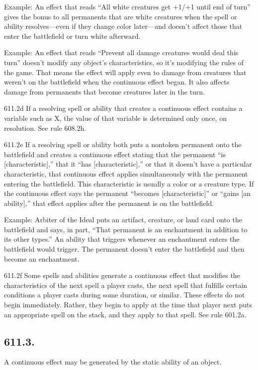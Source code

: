 Example: An effect that reads “All white creatures get +1/+1 until end of turn” gives the bonus to all permanents that are white creatures when the spell or ability resolves—even if they change color later—and doesn’t affect those that enter the battlefield or turn white afterward.

Example: An effect that reads “Prevent all damage creatures would deal this turn” doesn’t modify any object’s characteristics, so it’s modifying the rules of the game. That means the effect will apply even to damage from creatures that weren’t on the battlefield when the continuous effect began. It also affects damage from permanents that become creatures later in the turn.

611.2d If a resolving spell or ability that creates a continuous effect contains a variable such as X, the value of that variable is determined only once, on resolution. See rule 608.2h.

611.2e If a resolving spell or ability both puts a nontoken permanent onto the battlefield and creates a continuous effect stating that the permanent “is [characteristic],” that it “has [characteristic],” or that it doesn’t have a particular characteristic, that continuous effect applies simultaneously with the permanent entering the battlefield. This characteristic is usually a color or a creature type. If the continuous effect says the permanent “becomes [characteristic]” or “gains [an ability],” that effect applies after the permanent is on the battlefield.

Example: Arbiter of the Ideal puts an artifact, creature, or land card onto the battlefield and says, in part, “That permanent is an enchantment in addition to its other types.” An ability that triggers whenever an enchantment enters the battlefield would trigger. The permanent doesn’t enter the battlefield and then become an enchantment.

611.2f Some spells and abilities generate a continuous effect that modifies the characteristics of the next spell a player casts, the next spell that fulfills certain conditions a player casts during some duration, or similar. These effects do not begin immediately. Rather, they begin to apply at the time that player next puts an appropriate spell on the stack, and they apply to that spell. See rule 601.2a.

\subsection*{611.3.}
A continuous effect may be generated by the static ability of an object.

